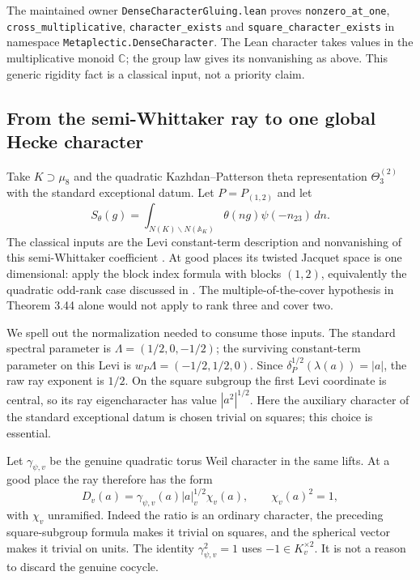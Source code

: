 \documentclass[11pt]{article}
\begin{document}
The maintained owner \texttt{DenseCharacterGluing.lean} proves
\texttt{nonzero\_at\_one}, \texttt{cross\_multiplicative},
\texttt{character\_exists} and \texttt{square\_character\_exists} in
namespace \texttt{Metaplectic.DenseCharacter}.
The Lean character takes values in the multiplicative monoid
$\mathbb C$; the group law gives its nonvanishing as above.
This generic rigidity fact is a classical input, not a priority claim.

\subsection{From the semi-Whittaker ray to one global Hecke character}
Take $K\supset\mu_8$ and the quadratic Kazhdan--Patterson theta
representation $\Theta^{(2)}_3$ with the standard exceptional datum.
Let $P=P_{(1,2)}$ and let
\[
 S_\theta(g)=\int_{N(K)\backslash N(\mathbb A_K)}
       \theta(ng)\psi(-n_{23})\,dn.
\]
The classical inputs are the Levi constant-term description and
nonvanishing of this semi-Whittaker coefficient
\cite[Theorems 4.3 and 4.4]{CaiSemiWhittaker}.
At good places its twisted Jacquet space is one dimensional:
apply the block index formula with blocks $(1,2)$, equivalently the
quadratic odd-rank case discussed in
\cite[Theorem 3.43 and Remark 3.46]{CaiSemiWhittaker}.
The multiple-of-the-cover hypothesis in Theorem 3.44 alone would
not apply to rank three and cover two.

We spell out the normalization needed to consume those inputs.
The standard spectral parameter is
$\Lambda=(1/2,0,-1/2)$; the surviving constant-term parameter on this
Levi is $w_P\Lambda=(-1/2,1/2,0)$. Since
$\delta_P^{1/2}(\lambda(a))=|a|$, the raw ray exponent is $1/2$.
On the square subgroup the first Levi coordinate is central, so its
ray eigencharacter has value $|a^2|^{1/2}$.
Here the auxiliary character of the standard exceptional datum is
chosen trivial on squares; this choice is essential.

Let $\gamma_{\psi,v}$ be the genuine quadratic torus Weil character
in the same lifts. At a good place the ray therefore has the form
\[
 D_v(a)=\gamma_{\psi,v}(a)|a|_v^{1/2}\chi_v(a),
 \qquad \chi_v(a)^2=1,
\]
with $\chi_v$ unramified. Indeed the ratio is an ordinary character,
the preceding square-subgroup formula makes it trivial on squares,
and the spherical vector makes it trivial on units.
The identity $\gamma_{\psi,v}^2=1$ uses $-1\in K_v^{\times2}$.
It is not a reason to discard the genuine cocycle.
\end{document}
